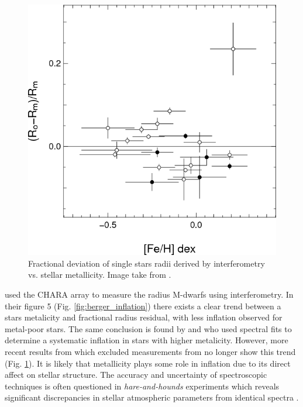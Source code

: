 \begin{figure}
    \centering
    \includegraphics[scale=0.5]{3-images/Demory.png}
    \caption{Fractional deviation of single stars radii derived by interferometry  \protect\citep{1998A&A...337..403B} vs. stellar metallicity. Image take from \protect\citet{2009A&A...505..205D}.}
    \label{fig:demory_inflation}
\end{figure}

\citet{2006ApJ...644..475B} used the CHARA array to measure the radius M-dwarfs using interferometry. In their figure 5 (Fig. \ref{fig:berger_inflation}) there exists a clear trend between a stars metalicity and fractional radius residual, with less inflation observed for metal-poor stars. The same conclusion is found by \citet{2000ApJ...535..965L} and \citet{2007ApJ...660..732L} who used spectral fits to determine a systematic inflation in stars with higher metalicity. 
However, more recent results from \citet{2009A&A...505..205D} which excluded measurements from  \citet{2006ApJ...644..475B} no longer show this trend (Fig. \ref{fig:demory_inflation}). It is likely that metallicity plays some role in inflation due to its direct affect on stellar structure. The accuracy and uncertainty of spectroscopic techniques is often questioned in \textit{hare-and-hounds} experiments which reveals significant discrepancies in stellar atmospheric parameters from identical spectra \citep{Jofre2016}. 

